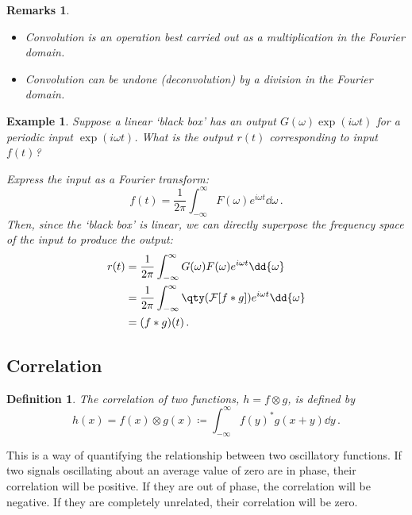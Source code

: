 \documentclass{article}
\theoremstyle{plain}\theoremheaderfont{\normalfont\itshape}\theorembodyfont{\rmfamily}\theoremseparator{.}\newtheorem*{rem}{Remark}\newtheorem*{ex}{Example}\newtheorem*{proof}{Proof}\newtheorem*{altp}{Alternative proof}
\theoremstyle{plain}\theoremheaderfont{\normalfont\bfseries}\theorembodyfont{\rmfamily}\theoremseparator{.}\newtheorem{thm}{Theorem}[section]\newtheorem{lem}[thm]{Lemma}\newtheorem{prop}[thm]{Proposition}\newtheorem*{cor}{Corollary}\newtheorem{defn}[thm]{Definition}\newtheorem{clm}[thm]{Claim}\newtheorem{clminproof}{Claim}
\theoremstyle{break}\theoremheaderfont{\normalfont\itshape}\theorembodyfont{\rmfamily}\theoremseparator{.\medskip}\newtheorem*{proofskip}{Proof}\newtheorem*{exs}{Examples}\newtheorem*{rems}{Remarks}
\theoremstyle{break}\theoremheaderfont{\normalfont\bfseries}\theorembodyfont{\rmfamily}\theoremseparator{.\medskip}\newtheorem{lemskip}[thm]{Lemma}\newtheorem{defnskip}[thm]{Definition}\newtheorem{propskip}[thm]{Proposition}\newtheorem{thmskip}[thm]{Theorem}
\numberwithin{equation}{section}
\begin{document}
	\begin{rems}
		\begin{itemize}[topsep=0pt]
			\item Convolution is an operation best carried out as a multiplication in the Fourier domain.
			\item Convolution can be undone (deconvolution) by a division in the Fourier domain.
		\end{itemize}
	\end{rems}
	
	\begin{ex}
		Suppose a linear `black box' has an output \(G(\omega)\exp(i\omega t)\) for a periodic input \(\exp(i\omega t)\). What is the output \(r(t)\) corresponding to input \(f(t)\)?
	
		Express the input as a Fourier transform:
		\[f(t)=\frac{1}{2\pi}\int_{-\infty}^{\infty}F(\omega)e^{i\omega t}\dd{\omega}\,.\]
		Then, since the `black box' is linear, we can directly superpose the frequency space of the input to produce the output:
		\begin{align*}
			r(t)&=\frac{1}{2\pi}\int_{-\infty}^{\infty}G(\omega)F(\omega)e^{i\omega t}\dd{\omega}\\
			&=\frac{1}{2\pi}\int_{-\infty}^{\infty}\qty(\mathcal{F}[f*g])e^{i\omega t}\dd{\omega}\\
			&=(f*g)(t)\,.
		\end{align*}
	\end{ex}
	
	\subsection{Correlation}
	\begin{defn}
		The \textit{correlation} of two functions, \(h=f\otimes g\), is defined by
		\[h(x)=f(x)\otimes g(x)\coloneqq\int_{-\infty}^{\infty}f(y)^* g(x+y)\dd{y}\,.\]
	\end{defn}
	
	This is a way of quantifying the relationship between two oscillatory functions. If two signals oscillating about an average value of zero are in phase, their correlation will be positive. If they are out of phase, the correlation will be negative. If they are completely unrelated, their correlation will be zero.
	
\end{document}
